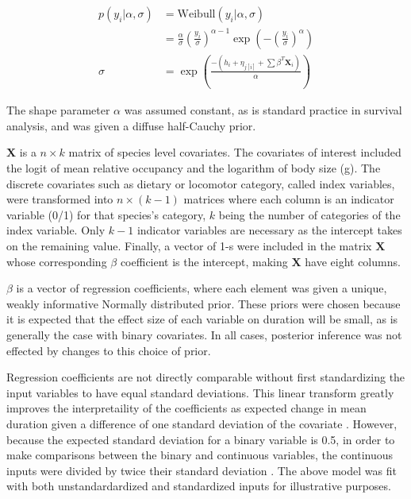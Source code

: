 \documentclass[12pt,letterpaper]{article}
\begin{document}
\begin{align}
  p(y_{i}|\alpha, \sigma) &= \mathrm{Weibull}(y_{i}|\alpha, \sigma) \nonumber \\ 
  &= \frac{\alpha}{\sigma} \left(\frac{y_{i}}{\sigma}\right)^{\alpha - 1} \exp\left(-\left(\frac{y_{i}}{\sigma}\right)^{\alpha}\right) \label{eq:weibull}\\
  \sigma &= \exp\left(\frac{-(h_{i} + \eta_{j[i]} + \sum \beta^{T} \mathbf{X}_{i})}{\alpha}\right) \label{eq:reg}
\end{align}

The shape parameter \(\alpha\) was assumed constant, as is standard practice in survival analysis, and was given a diffuse half-Cauchy prior. 

\(\mathbf{X}\) is a \(n \times k\) matrix of species level covariates. The covariates of interest included the logit of mean relative occupancy and the logarithm of body size (g). The discrete covariates such as dietary or locomotor category, called index variables, were transformed into \(n \times (k - 1)\) matrices where each column is an indicator variable (0/1) for that species's category, \(k\) being the number of categories of the index variable. Only \(k - 1\) indicator variables are necessary as the intercept takes on the remaining value. Finally, a vector of 1-s were included in the matrix \(\mathbf{X}\) whose corresponding \(\beta\) coefficient is the intercept, making \(\mathbf{X}\) have eight columns.

\(\beta\) is a vector of regression coefficients, where each element was given a unique, weakly informative Normally distributed prior. These priors were chosen because it is expected that the effect size of each variable on duration will be small, as is generally the case with binary covariates. In all cases, posterior inference was not effected by changes to this choice of prior. %

Regression coefficients are not directly comparable without first standardizing the input variables to have equal standard deviations. This linear transform greatly improves the interpretaility of the coefficients as expected change in mean duration given a difference of one standard deviation of the covariate \citep{Schielzeth2010}. However, because the expected standard deviation for a binary variable is 0.5, in order to make comparisons between the binary and continuous variables, the continuous inputs were divided by twice their standard deviation \citep{Gelman2008}. The above model was fit with both unstandardardized and standardized inputs for illustrative purposes.
\end{document}
